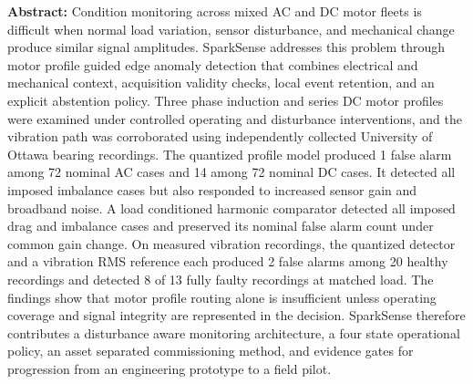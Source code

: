 \documentclass[10pt,twocolumn]{article}
\begin{document}

\noindent\textbf{Abstract:} Condition monitoring across mixed AC and DC motor fleets is difficult when normal load variation, sensor disturbance, and mechanical change produce similar signal amplitudes. SparkSense addresses this problem through motor profile guided edge anomaly detection that combines electrical and mechanical context, acquisition validity checks, local event retention, and an explicit abstention policy. Three phase induction and series DC motor profiles were examined under controlled operating and disturbance interventions, and the vibration path was corroborated using independently collected University of Ottawa bearing recordings. The quantized profile model produced 1 false alarm among 72 nominal AC cases and 14 among 72 nominal DC cases. It detected all imposed imbalance cases but also responded to increased sensor gain and broadband noise. A load conditioned harmonic comparator detected all imposed drag and imbalance cases and preserved its nominal false alarm count under common gain change. On measured vibration recordings, the quantized detector and a vibration RMS reference each produced 2 false alarms among 20 healthy recordings and detected 8 of 13 fully faulty recordings at matched load. The findings show that motor profile routing alone is insufficient unless operating coverage and signal integrity are represented in the decision. SparkSense therefore contributes a disturbance aware monitoring architecture, a four state operational policy, an asset separated commissioning method, and evidence gates for progression from an engineering prototype to a field pilot.
\end{document}
